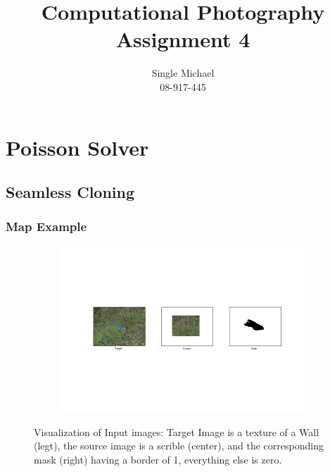 \documentclass{paper}
\title{Computational Photography Assignment 4}
\author{Single Michael\\08-917-445}
\begin{document}
\maketitle


\section{Poisson Solver}
\subsection{Seamless Cloning}

\subsubsection{Map Example}
\begin{figure}[H]
    \centering
    \begin{subfigure}{1.0\textwidth}
        \includegraphics[width=\textwidth]{../../outputs/p4/seamless_cloning/map/input}
    \end{subfigure}
    \caption{Visualization of Input images: Target Image is a texture of a Wall (legt), the source image is a scrible (center), and the corresponding mask (right) having a border of 1, everything else is zero.}
    \label{fig:gradient_mixing_input}       
\end{figure}
\end{document}
